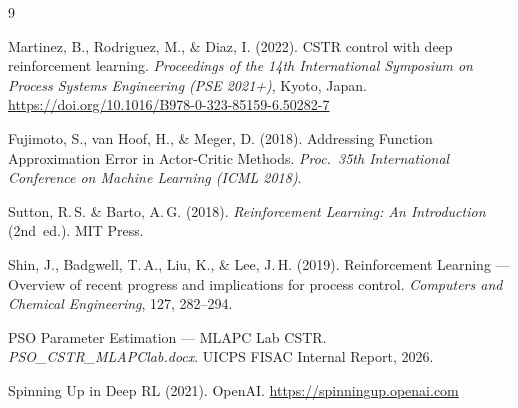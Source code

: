 \documentclass[12pt,a4paper]{article}
\begin{document}
\newpage
\begin{thebibliography}{9}

Martinez, B., Rodriguez, M., \& Diaz, I. (2022).
CSTR control with deep reinforcement learning.
\textit{Proceedings of the 14th International Symposium on Process Systems
Engineering (PSE 2021+)}, Kyoto, Japan.
\url{https://doi.org/10.1016/B978-0-323-85159-6.50282-7}

Fujimoto, S., van Hoof, H., \& Meger, D. (2018).
Addressing Function Approximation Error in Actor-Critic Methods.
\textit{Proc.\ 35th International Conference on Machine Learning (ICML 2018)}.

Sutton, R.\,S. \& Barto, A.\,G. (2018).
\textit{Reinforcement Learning: An Introduction} (2nd~ed.).
MIT Press.

Shin, J., Badgwell, T.\,A., Liu, K., \& Lee, J.\,H. (2019).
Reinforcement Learning --- Overview of recent progress and implications for
process control.
\textit{Computers and Chemical Engineering}, 127, 282--294.

PSO Parameter Estimation --- MLAPC Lab CSTR\@.
\textit{PSO\_CSTR\_MLAPClab.docx}.
UICPS FISAC Internal Report, 2026.

Spinning Up in Deep RL (2021). OpenAI.
\url{https://spinningup.openai.com}

\end{thebibliography}
\end{document}
